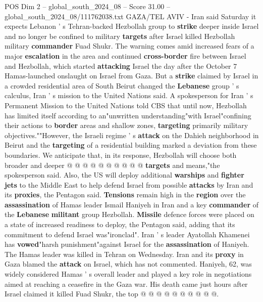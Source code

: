 \begin{textsample}{POS Dim 2 – global\_south\_2024\_08 – Score 31.00 – global\_south\_2024\_08/111762038.txt}  \label{ex:f2_pos_011}
GAZA/TEL AVIV - Iran said Saturday it expects Lebanon ' s Tehran-backed Hezbollah group to \textbf{strike} deeper inside Israel and no longer be confined to military \textbf{targets} after Israel killed Hezbollah military \textbf{commander} Fuad Shukr.
The warning comes amid increased fears of a major \textbf{escalation} in the area and continued \textbf{cross-border} fire between Israel and Hezbollah, which started \textbf{attacking} Israel the day after the October 7 Hamas-launched onslaught on Israel from Gaza.
But a \textbf{strike} claimed by Israel in a crowded residential area of South Beirut changed the \textbf{Lebanese} group ' s calculus, Iran ' s mission to the United Nations said.
A spokesperson for Iran ' s Permanent Mission to the United Nations told CBS that until now, Hezbollah has limited itself according to an"unwritten understanding"with Israel"confining their actions to \textbf{border} areas and shallow zones, \textbf{targeting} primarily military objectives.""However, the Israeli regime ' s \textbf{attack} on the Dahieh neighborhood in Beirut and the \textbf{targeting} of a residential building marked a deviation from these boundaries.
We anticipate that, in its response, Hezbollah will choose both broader and deeper @ @ @ @ @ @ @ @ @ @ \textbf{targets} and means,"the spokesperson said.
Also, the US will deploy additional \textbf{warships} and \textbf{fighter} \textbf{jets} to the Middle East to help defend Israel from possible \textbf{attacks} by Iran and its \textbf{proxies}, the Pentagon said. \textbf{Tensions} remain high in the \textbf{region} over the \textbf{assassination} of Hamas leader Ismail Haniyeh in Iran and a key \textbf{commander} of the \textbf{Lebanese} \textbf{militant} group Hezbollah. \textbf{Missile} defence forces were placed on a state of increased readiness to deploy, the Pentagon said, adding that its commitment to defend Israel was"ironclad".
Iran ' s leader Ayatollah Khamenei has \textbf{vowed}"harsh punishment"against Israel for the \textbf{assassination} of Haniyeh.
The Hamas leader was killed in Tehran on Wednesday.
Iran and its \textbf{proxy} in Gaza blamed the \textbf{attack} on Israel, which has not commented.
Haniyeh, 62, was widely considered Hamas ' s overall leader and played a key role in negotiations aimed at reaching a ceasefire in the Gaza war.
His death came just hours after Israel claimed it killed Fuad Shukr, the top @ @ @ @ @ @ @ @ @ @.

\end{textsample}
